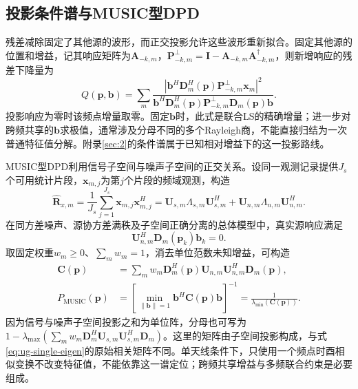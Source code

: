 \subsection{投影条件谱与MUSIC型DPD}\label{sec:ug-spectra}
残差减除固定了其他源的波形，而正交投影允许这些波形重新拟合。固定其他源的位置和增益，记其响应矩阵为$\mathbf A_{-k,m}$，$\mathbf P_{-k,m}^\perp=\mathbf I-\mathbf A_{-k,m}\mathbf A_{-k,m}^\dagger$，则新增响应的残差下降量为
\begin{equation}\label{eq:ug-projection}
Q(\mathbf p,\mathbf b)=\sum_m
\frac{|\mathbf b^H\mathbf D_m^H(\mathbf p)\mathbf P_{-k,m}^\perp\mathbf x_m|^2}
{\mathbf b^H\mathbf D_m^H(\mathbf p)\mathbf P_{-k,m}^\perp\mathbf D_m(\mathbf p)\mathbf b}.
\end{equation}
投影响应为零时该频点增量取零。固定$\mathbf b$时，此式是联合LS的精确增量；进一步对跨频共享的$\mathbf b$求极值，通常涉及分母不同的多个Rayleigh商，不能直接归结为一次普通特征值分解。附录\ref{sec:2}的条件谱属于已知相对增益下的这一投影路线。

MUSIC型DPD利用信号子空间与噪声子空间的正交关系\cite{ref04}。设同一观测记录提供$J_s$个可用统计片段，$\mathbf x_{m,j}$为第$j$个片段的频域观测，构造
\begin{equation}\label{eq:ug-covariance}
\widehat{\mathbf R}_{x,m}=\frac1{J_s}\sum_{j=1}^{J_s}\mathbf x_{m,j}\mathbf x_{m,j}^H
=\mathbf U_{s,m}\Lambda_{s,m}\mathbf U_{s,m}^H+
\mathbf U_{n,m}\Lambda_{n,m}\mathbf U_{n,m}^H.
\end{equation}
在同方差噪声、源协方差满秩及子空间正确分离的总体模型中，真实源响应满足
\[\mathbf U_{n,m}^H\mathbf D_m(\mathbf p_k)\mathbf b_k=0.\]
取固定权重$w_m\geq0$、$\sum_mw_m=1$，消去单位范数未知增益，可构造
\begin{equation}\label{eq:ug-music}
\begin{aligned}
\mathbf C(\mathbf p)&=\sum_mw_m\mathbf D_m^H(\mathbf p)
\mathbf U_{n,m}\mathbf U_{n,m}^H\mathbf D_m(\mathbf p),\\
P_{\mathrm{MUSIC}}(\mathbf p)&=\left[
\min_{\|\mathbf b\|=1}\mathbf b^H\mathbf C(\mathbf p)\mathbf b\right]^{-1}
=\frac1{\lambda_{\min}(\mathbf C(\mathbf p))}.
\end{aligned}
\end{equation}
因为信号与噪声子空间投影之和为单位阵，分母也可写为$1-\lambda_{\max}(\sum_mw_m\mathbf D_m^H\mathbf U_{s,m}\mathbf U_{s,m}^H\mathbf D_m)$。这里的矩阵由子空间投影构成，与式\eqref{eq:ug-single-eigen}的原始相关矩阵不同。单天线条件下，只使用一个频点时酉相似变换不改变特征值，不能依靠这一谱定位；跨频共享增益与多频联合约束是必要组成。

